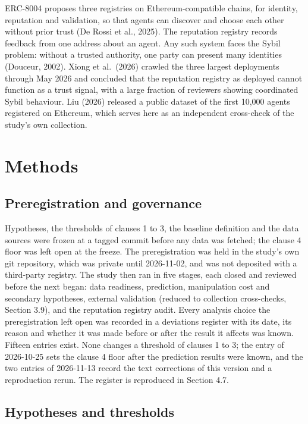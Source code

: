 \documentclass[
  11pt,
  a4paper,
]{article}
\begin{document}
ERC-8004 proposes three registries on Ethereum-compatible chains, for
identity, reputation and validation, so that agents can discover and
choose each other without prior trust (De Rossi et al., 2025). The
reputation registry records feedback from one address about an agent.
Any such system faces the Sybil problem: without a trusted authority,
one party can present many identities (Douceur, 2002). Xiong et
al.~(2026) crawled the three largest deployments through May 2026 and
concluded that the reputation registry as deployed cannot function as a
trust signal, with a large fraction of reviewers showing coordinated
Sybil behaviour. Liu (2026) released a public dataset of the first
10,000 agents registered on Ethereum, which serves here as an
independent cross-check of the study's own collection.

\hypertarget{methods}{%
\section{Methods}\label{methods}}

\hypertarget{preregistration-and-governance}{%
\subsection{Preregistration and
governance}\label{preregistration-and-governance}}

Hypotheses, the thresholds of clauses 1 to 3, the baseline definition
and the data sources were frozen at a tagged commit before any data was
fetched; the clause 4 floor was left open at the freeze. The
preregistration was held in the study's own git repository, which was
private until 2026-11-02, and was not deposited with a third-party
registry. The study then ran in five stages, each closed and reviewed
before the next began: data readiness, prediction, manipulation cost and
secondary hypotheses, external validation (reduced to collection
cross-checks, Section 3.9), and the reputation registry audit. Every
analysis choice the preregistration left open was recorded in a
deviations register with its date, its reason and whether it was made
before or after the result it affects was known. Fifteen entries exist.
None changes a threshold of clauses 1 to 3; the entry of 2026-10-25 sets
the clause 4 floor after the prediction results were known, and the two
entries of 2026-11-13 record the text corrections of this version and a
reproduction rerun. The register is reproduced in Section 4.7.

\hypertarget{hypotheses-and-thresholds}{%
\subsection{Hypotheses and thresholds}\label{hypotheses-and-thresholds}}
\end{document}
